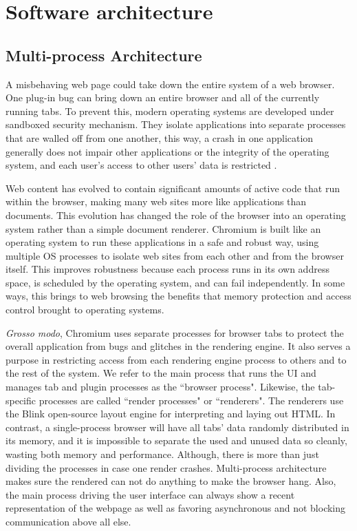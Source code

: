 \chapter{Software architecture}
\label{chap:architecture}



\section{Multi-process Architecture}

A misbehaving web page could take down the entire system of a web browser. One plug-in bug can bring down an entire browser and all of the currently running tabs. To prevent this, modern operating systems are developed under sandboxed security mechanism. They isolate applications into separate processes that are walled off from one another, this way, a crash in one application generally does not impair other applications or the integrity of the operating system, and each user's access to other users' data is restricted \cite{man}.

Web content has evolved to contain significant amounts of active code that run within the browser, making many web sites more like applications than documents. This evolution has changed the role of the browser into an operating system rather than a simple document renderer. Chromium is built like an operating system to run these applications in a safe and robust way, using multiple OS processes to isolate web sites from each other and from the browser itself. This improves robustness because each process runs in its own address space, is scheduled by the operating system, and can fail independently. In some ways, this brings to web browsing the benefits that memory protection and access control brought to operating systems.

\textit{Grosso modo}, Chromium uses separate processes for browser tabs to protect the overall application from bugs and glitches in the rendering engine. It also serves a purpose in restricting access from each rendering engine process to others and to the rest of the system. We refer to the main process that runs the UI and manages tab and plugin processes as the ``browser process". Likewise, the tab-specific processes are called ``render processes" or ``renderers". The renderers use the Blink open-source layout engine for interpreting and laying out HTML. In contrast, a single-process browser will have all tabs' data randomly distributed in its memory, and it is impossible to separate the used and unused data so cleanly, wasting both memory and performance. Although, there is more than just dividing the processes in case one render crashes. Multi-process architecture makes sure the rendered can not do anything to make the browser hang. Also, the main process driving the user interface can always show a recent representation of the webpage as well as favoring asynchronous and not blocking communication above all else.

